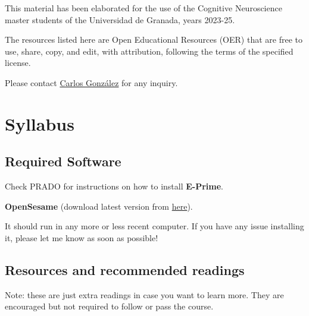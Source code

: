 \documentclass[
  letterpaper,
  DIV=11,
  numbers=noendperiod]{scrreprt}
\begin{document}
\begin{tcolorbox}[enhanced jigsaw, opacitybacktitle=0.6, arc=.35mm, colbacktitle=quarto-callout-warning-color!10!white, bottomrule=.15mm, titlerule=0mm, coltitle=black, title=\textcolor{quarto-callout-warning-color}{\faExclamationTriangle}\hspace{0.5em}{Disclaimer}, toprule=.15mm, left=2mm, colback=white, rightrule=.15mm, bottomtitle=1mm, colframe=quarto-callout-warning-color-frame, opacityback=0, toptitle=1mm, breakable, leftrule=.75mm]

This material has been elaborated for the use of the Cognitive
Neuroscience master students of the Universidad de Granada, years
2023-25.

The resources listed here are Open Educational Resources (OER) that are
free to use, share, copy, and edit, with attribution, following the
terms of the specified license.

Please contact \href{https://ugr.es/~cgonzalez}{Carlos González} for any
inquiry.

\end{tcolorbox}


\hypertarget{syllabus}{%
\chapter{Syllabus}\label{syllabus}}

\hypertarget{required-software}{%
\section{Required Software}\label{required-software}}

Check PRADO for instructions on how to install \textbf{E-Prime}.

\textbf{OpenSesame} (download latest version from
\href{https://osdoc.cogsci.nl/4.0/download/}{here}).

It should run in any more or less recent computer. If you have any issue
installing it, please let me know as soon as possible!

\hypertarget{resources-and-recommended-readings}{%
\section{Resources and recommended
readings}\label{resources-and-recommended-readings}}

\begin{tcolorbox}[enhanced jigsaw, opacitybacktitle=0.6, arc=.35mm, colbacktitle=quarto-callout-note-color!10!white, bottomrule=.15mm, titlerule=0mm, coltitle=black, title=\textcolor{quarto-callout-note-color}{\faInfo}\hspace{0.5em}{Note}, toprule=.15mm, left=2mm, colback=white, rightrule=.15mm, bottomtitle=1mm, colframe=quarto-callout-note-color-frame, opacityback=0, toptitle=1mm, breakable, leftrule=.75mm]

Note: these are just extra readings in case you want to learn more. They
are encouraged but not required to follow or pass the course.

\end{tcolorbox}
\end{document}
